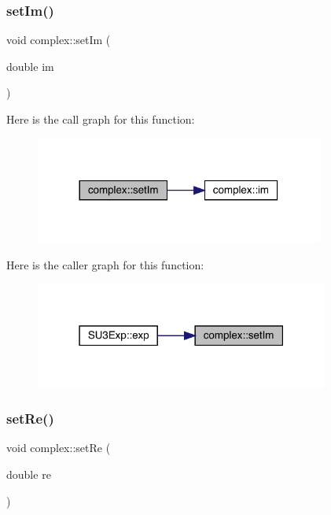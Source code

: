 \subsubsection{\texorpdfstring{setIm()}{setIm()}}
{\footnotesize\ttfamily void complex\+::set\+Im (\begin{DoxyParamCaption}\item[{double}]{im }\end{DoxyParamCaption})\hspace{0.3cm}{\ttfamily [inline]}}

Here is the call graph for this function\+:\nopagebreak
\begin{figure}[H]
\begin{center}
\leavevmode
\includegraphics[width=269pt]{classcomplex_aa4c37b87b5b9beebddad476b3049394c_cgraph}
\end{center}
\end{figure}
Here is the caller graph for this function\+:\nopagebreak
\begin{figure}[H]
\begin{center}
\leavevmode
\includegraphics[width=274pt]{classcomplex_aa4c37b87b5b9beebddad476b3049394c_icgraph}
\end{center}
\end{figure}
\mbox{\label{classcomplex_a360f0c3963a8e654ccbc16712294f4d7}} 
\subsubsection{\texorpdfstring{setRe()}{setRe()}}
{\footnotesize\ttfamily void complex\+::set\+Re (\begin{DoxyParamCaption}\item[{double}]{re }\end{DoxyParamCaption})\hspace{0.3cm}{\ttfamily [inline]}}

